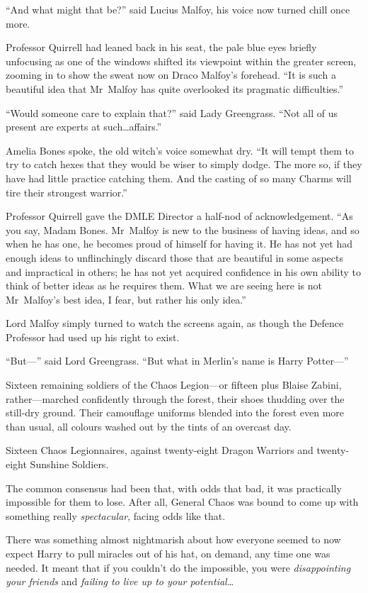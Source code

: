 “And what might that be?” said Lucius Malfoy, his voice now turned chill once more.

Professor Quirrell had leaned back in his seat, the pale blue eyes briefly unfocusing as one of the windows shifted its viewpoint within the greater screen, zooming in to show the sweat now on Draco Malfoy’s forehead. “It is such a beautiful idea that Mr~Malfoy has quite overlooked its pragmatic difficulties.”

“Would someone care to explain that?” said Lady Greengrass. “Not all of us present are experts at such…affairs.”

Amelia Bones spoke, the old witch’s voice somewhat dry. “It will tempt them to try to catch hexes that they would be wiser to simply dodge. The more so, if they have had little practice catching them. And the casting of so many Charms will tire their strongest warrior.”

Professor Quirrell gave the DMLE Director a half-nod of acknowledgement. “As you say, Madam Bones. Mr~Malfoy is new to the business of having ideas, and so when he has one, he becomes proud of himself for having it. He has not yet had enough ideas to unflinchingly discard those that are beautiful in some aspects and impractical in others; he has not yet acquired confidence in his own ability to think of better ideas as he requires them. What we are seeing here is not Mr~Malfoy’s best idea, I fear, but rather his only idea.”

Lord Malfoy simply turned to watch the screens again, as though the Defence Professor had used up his right to exist.

“But—” said Lord Greengrass. “But what in Merlin’s name is Harry Potter—”

\later

Sixteen remaining soldiers of the Chaos Legion—or fifteen plus Blaise Zabini, rather—marched confidently through the forest, their shoes thudding over the still-dry ground. Their camouflage uniforms blended into the forest even more than usual, all colours washed out by the tints of an overcast day.

Sixteen Chaos Legionnaires, against twenty-eight Dragon Warriors and twenty-eight Sunshine Soldiers.

The common consensus had been that, with odds that bad, it was practically impossible for them to lose. After all, General Chaos was bound to come up with something really \emph{spectacular}, facing odds like that.

There was something almost nightmarish about how everyone seemed to now expect Harry to pull miracles out of his hat, on demand, any time one was needed. It meant that if you couldn’t do the impossible, you were \emph{disappointing your friends} and \emph{failing to live up to your potential…}

